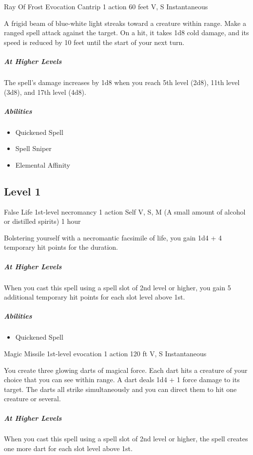 \documentclass[letterpaper,openany,oneside,twocolumn]{book}
\begin{document}
\DndSpellHeader
  {Ray Of Frost}
  {Evocation Cantrip}
  {1 action}
  {60 feet}
  {V, S}
  {Instantaneous}

A frigid beam of blue-white light streaks toward a creature within range. Make a ranged spell attack against the target. On a hit, it takes 1d8 cold damage, and its speed is reduced by 10 feet until the start of your next turn.

\subparagraph*{At Higher Levels} The spell's damage increases by 1d8 when you reach 5th level (2d8), 11th level (3d8), and 17th level (4d8).

\subparagraph*{Abilities}
\begin{itemize}
  \item Quickened Spell
  \item Spell Sniper
  \item Elemental Affinity
\end{itemize}


\subsection*{Level 1}

\DndSpellHeader
  {False Life}
  {1st-level necromancy}
  {1 action}
  {Self}
  {V, S, M (A small amount of alcohol or distilled spirits)}
  {1 hour}

Bolstering yourself with a necromantic facsimile of life, you gain 1d4 + 4 temporary hit points for the duration.

\subparagraph*{At Higher Levels} When you cast this spell using a spell slot of 2nd level or higher, you gain 5 additional temporary hit points for each slot level above 1st.

\subparagraph*{Abilities}
\begin{itemize}
  \item Quickened Spell
\end{itemize}

\DndSpellHeader
  {Magic Missile}
  {1st-level evocation}
  {1 action}
  {120 ft}
  {V, S}
  {Instantaneous}

You create three glowing darts of magical force. Each dart hits a creature of your choice that you can see within range. A dart deals 1d4 + 1 force damage to its target. The darts all strike simultaneously and you can direct them to hit one creature or several.

\subparagraph{At Higher Levels} When you cast this spell using a spell slot of 2nd level or higher, the spell creates one more dart for each slot level above 1st.
\end{document}
